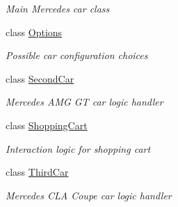 \begin{DoxyCompactItemize}
\begin{DoxyCompactList}\small\item\em Main Mercedes car class \end{DoxyCompactList}\item 
class \mbox{\hyperlink{class_project_app_1_1_options}{Options}}
\begin{DoxyCompactList}\small\item\em Possible car configuration choices \end{DoxyCompactList}\item 
class \mbox{\hyperlink{class_project_app_1_1_second_car}{Second\+Car}}
\begin{DoxyCompactList}\small\item\em Mercedes A\+MG GT car logic handler \end{DoxyCompactList}\item 
class \mbox{\hyperlink{class_project_app_1_1_shopping_cart}{Shopping\+Cart}}
\begin{DoxyCompactList}\small\item\em Interaction logic for shopping cart \end{DoxyCompactList}\item 
class \mbox{\hyperlink{class_project_app_1_1_third_car}{Third\+Car}}
\begin{DoxyCompactList}\small\item\em Mercedes C\+LA Coupe car logic handler \end{DoxyCompactList}\end{DoxyCompactItemize}
